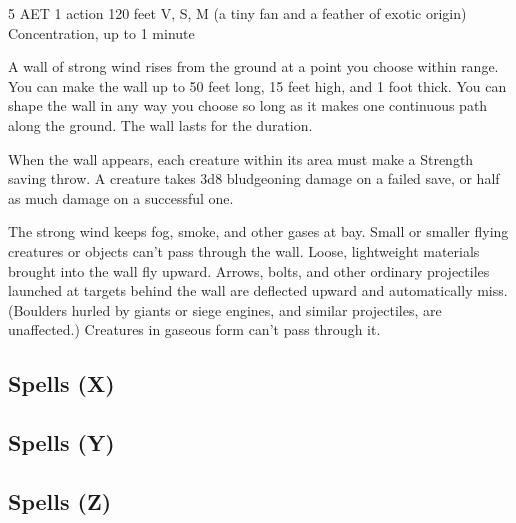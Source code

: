\label{spell:wind-wall}
{5 AET}
{1 action}
{120 feet}
{V, S, M (a tiny fan and a feather of exotic origin)}
{Concentration, up to 1 minute}

A wall of strong wind rises from the ground at a point you choose within range. You can make the wall up to 50 feet long, 15 feet high, and 1 foot thick. You can shape the wall in any way you choose so long as it makes one continuous path along the ground. The wall lasts for the duration.

When the wall appears, each creature within its area must make a Strength saving throw. A creature takes 3d8 bludgeoning damage on a failed save, or half as much damage on a successful one.

The strong wind keeps fog, smoke, and other gases at bay. Small or smaller flying creatures or objects can't pass through the wall. Loose, lightweight materials brought into the wall fly upward. Arrows, bolts, and other ordinary projectiles launched at targets behind the wall are deflected upward and automatically miss. (Boulders hurled by giants or siege engines, and similar projectiles, are unaffected.) Creatures in gaseous form can't pass through it.

\subsection{Spells (X)}

\subsection{Spells (Y)}

\subsection{Spells (Z)}